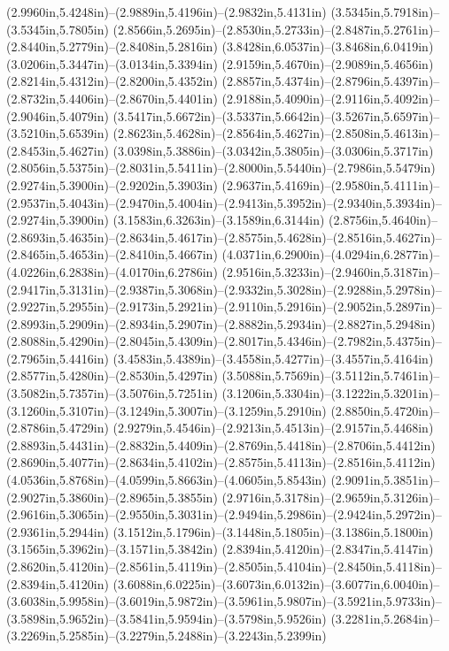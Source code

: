 (2.9960in,5.4248in)--(2.9889in,5.4196in)--(2.9832in,5.4131in) (3.5345in,5.7918in)--(3.5345in,5.7805in) (2.8566in,5.2695in)--(2.8530in,5.2733in)--(2.8487in,5.2761in)--(2.8440in,5.2779in)--(2.8408in,5.2816in) (3.8428in,6.0537in)--(3.8468in,6.0419in) (3.0206in,5.3447in)--(3.0134in,5.3394in) (2.9159in,5.4670in)--(2.9089in,5.4656in) (2.8214in,5.4312in)--(2.8200in,5.4352in) (2.8857in,5.4374in)--(2.8796in,5.4397in)--(2.8732in,5.4406in)--(2.8670in,5.4401in) (2.9188in,5.4090in)--(2.9116in,5.4092in)--(2.9046in,5.4079in) (3.5417in,5.6672in)--(3.5337in,5.6642in)--(3.5267in,5.6597in)--(3.5210in,5.6539in) (2.8623in,5.4628in)--(2.8564in,5.4627in)--(2.8508in,5.4613in)--(2.8453in,5.4627in) (3.0398in,5.3886in)--(3.0342in,5.3805in)--(3.0306in,5.3717in) (2.8056in,5.5375in)--(2.8031in,5.5411in)--(2.8000in,5.5440in)--(2.7986in,5.5479in) (2.9274in,5.3900in)--(2.9202in,5.3903in) (2.9637in,5.4169in)--(2.9580in,5.4111in)--(2.9537in,5.4043in)--(2.9470in,5.4004in)--(2.9413in,5.3952in)--(2.9340in,5.3934in)--(2.9274in,5.3900in) (3.1583in,6.3263in)--(3.1589in,6.3144in) (2.8756in,5.4640in)--(2.8693in,5.4635in)--(2.8634in,5.4617in)--(2.8575in,5.4628in)--(2.8516in,5.4627in)--(2.8465in,5.4653in)--(2.8410in,5.4667in) (4.0371in,6.2900in)--(4.0294in,6.2877in)--(4.0226in,6.2838in)--(4.0170in,6.2786in) (2.9516in,5.3233in)--(2.9460in,5.3187in)--(2.9417in,5.3131in)--(2.9387in,5.3068in)--(2.9332in,5.3028in)--(2.9288in,5.2978in)--(2.9227in,5.2955in)--(2.9173in,5.2921in)--(2.9110in,5.2916in)--(2.9052in,5.2897in)--(2.8993in,5.2909in)--(2.8934in,5.2907in)--(2.8882in,5.2934in)--(2.8827in,5.2948in) (2.8088in,5.4290in)--(2.8045in,5.4309in)--(2.8017in,5.4346in)--(2.7982in,5.4375in)--(2.7965in,5.4416in) (3.4583in,5.4389in)--(3.4558in,5.4277in)--(3.4557in,5.4164in) (2.8577in,5.4280in)--(2.8530in,5.4297in) (3.5088in,5.7569in)--(3.5112in,5.7461in)--(3.5082in,5.7357in)--(3.5076in,5.7251in) (3.1206in,5.3304in)--(3.1222in,5.3201in)--(3.1260in,5.3107in)--(3.1249in,5.3007in)--(3.1259in,5.2910in) (2.8850in,5.4720in)--(2.8786in,5.4729in) (2.9279in,5.4546in)--(2.9213in,5.4513in)--(2.9157in,5.4468in) (2.8893in,5.4431in)--(2.8832in,5.4409in)--(2.8769in,5.4418in)--(2.8706in,5.4412in) (2.8690in,5.4077in)--(2.8634in,5.4102in)--(2.8575in,5.4113in)--(2.8516in,5.4112in) (4.0536in,5.8768in)--(4.0599in,5.8663in)--(4.0605in,5.8543in) (2.9091in,5.3851in)--(2.9027in,5.3860in)--(2.8965in,5.3855in) (2.9716in,5.3178in)--(2.9659in,5.3126in)--(2.9616in,5.3065in)--(2.9550in,5.3031in)--(2.9494in,5.2986in)--(2.9424in,5.2972in)--(2.9361in,5.2944in) (3.1512in,5.1796in)--(3.1448in,5.1805in)--(3.1386in,5.1800in) (3.1565in,5.3962in)--(3.1571in,5.3842in) (2.8394in,5.4120in)--(2.8347in,5.4147in) (2.8620in,5.4120in)--(2.8561in,5.4119in)--(2.8505in,5.4104in)--(2.8450in,5.4118in)--(2.8394in,5.4120in) (3.6088in,6.0225in)--(3.6073in,6.0132in)--(3.6077in,6.0040in)--(3.6038in,5.9958in)--(3.6019in,5.9872in)--(3.5961in,5.9807in)--(3.5921in,5.9733in)--(3.5898in,5.9652in)--(3.5841in,5.9594in)--(3.5798in,5.9526in) (3.2281in,5.2684in)--(3.2269in,5.2585in)--(3.2279in,5.2488in)--(3.2243in,5.2399in) 